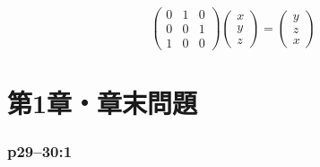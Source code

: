 \begin{tanswer}
  \[
    \begin{pmatrix}
      0 & 1 & 0 \\
      0 & 0 & 1 \\
      1 & 0 & 0
    \end{pmatrix}
    \begin{pmatrix}
      x \\
      y \\
      z
    \end{pmatrix}
    =\begin{pmatrix}
      y \\
      z \\
      x
    \end{pmatrix}
  \]
\end{tanswer}


\setcounter{equation}{0}

\part*{第1章・章末問題}


\section*{p29--30:1}

